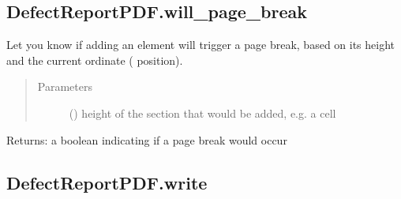 \documentclass[letterpaper,10pt,english]{sphinxmanual}
\begin{document}
\begin{fulllineitems}
\begin{fulllineitems}
\end{fulllineitems}



\subsection{DefectReportPDF.will\_page\_break}
\label{\detokenize{generated/quality_assessment.quality_pdf_report.DefectReportPDF.will_page_break:defectreportpdf-will-page-break}}\label{\detokenize{generated/quality_assessment.quality_pdf_report.DefectReportPDF.will_page_break::doc}}

\begin{fulllineitems}
\label{\detokenize{generated/quality_assessment.quality_pdf_report.DefectReportPDF.will_page_break:quality_assessment.quality_pdf_report.DefectReportPDF.will_page_break}}
\sphinxAtStartPar
Let you know if adding an element will trigger a page break,
based on its height and the current ordinate ( position).
\begin{quote}\begin{description}
\item[{Parameters}] \leavevmode
\sphinxAtStartPar
{} () \textendash{} height of the section that would be added, e.g. a cell

\end{description}\end{quote}

\sphinxAtStartPar
Returns: a boolean indicating if a page break would occur

\end{fulllineitems}



\subsection{DefectReportPDF.write}
\label{\detokenize{generated/quality_assessment.quality_pdf_report.DefectReportPDF.write:defectreportpdf-write}}\label{\detokenize{generated/quality_assessment.quality_pdf_report.DefectReportPDF.write::doc}}


\end{fulllineitems}
\end{document}
